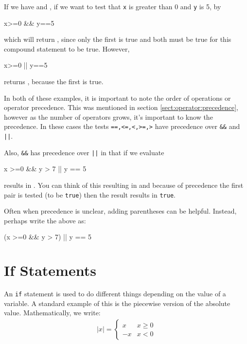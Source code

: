 If we have  and
, if we want to test that \texttt{x} is greater than 0 and
\texttt{y} is 5, by

\begin{jlblock}[bool]
x>=0 && y==5
\end{jlblock}
%
which will return   \printpythontex[verb], since only the first is true and both must be true for this compound statement to be true. However,

\begin{jlblock}[bool]
x>=0 || y==5
\end{jlblock}
%
returns  \printpythontex[verb], because the first is true.

In both of these examples, it is important to note the order of operations or operator precedence.  This was mentioned in section \ref{sect:operator:precedence}, however as the number of operators grows, it's important to know the precedence.  In these cases the tests \texttt{==,<=,<,>=,>} have precedence over \verb!&&! and \verb!||!. 

Also, \verb!&&! has precedence over \verb!||! in that if we evaluate
\begin{jlblock}[bool]
x >=0 && y > 7 || y == 5
\end{jlblock}
results in  \printpythontex[verb]. You can think of this resulting in  and because of precedence the first pair is tested (to be \texttt{true}) then the result  results in \texttt{true}. 

Often when precedence is unclear, adding parentheses can be helpful.  Instead, perhaps write the above as:
\begin{jlblock}[bool]
(x >=0 && y > 7) || y == 5
\end{jlblock}

\section{If Statements}

An \texttt{if} statement is used to do different things depending on the value of a variable. A standard example of this is the piecewise version of the absolute value.
Mathematically, we write: 
\begin{align*}
|x|=\begin{cases}
x & x \geq 0 \\
-x & x < 0
\end{cases}
\end{align*}

